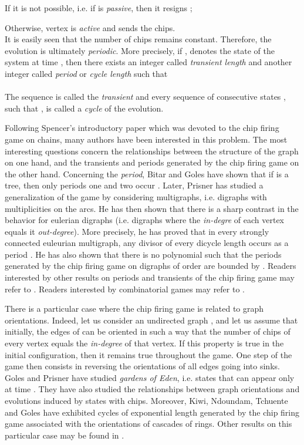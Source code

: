 \documentclass{article}
\begin{document}
\hspace{2mm} If it is not possible, i.e. if  is {\em passive}, then it
resigns ;

\hspace{2mm} Otherwise, vertex  is {\em active} and sends the chips.\\
It is easily seen that the number of chips remains constant. Therefore, the
evolution is ultimately {\em periodic}. More precisely, if ,
denotes the state of the system at time , then there exists an integer 
called {\em transient length} and another integer  called {\em period}
or  {\em cycle length } such that \\
\\
The sequence  is called the {\em transient} and every
sequence of  consecutive states , such that
, is called a {\em cycle} of the evolution.

Following Spencer's introductory paper \cite{SPE:86} which was devoted to the
chip firing game on chains, many authors have been interested in this
problem. The most interesting questions concern the relationships between the
structure of the graph on one hand, and the transients and periods generated
by the chip firing game on the other hand. Concerning the {\em period}, Bitar and
Goles have shown that if  is a tree, then only periods one and two occur
\cite{BIT:92}. Later, Prisner has studied a generalization of the game by
considering multigraphs, i.e. digraphs with multiplicities on the arcs. He
has then shown that there is a sharp contrast in the behavior for eulerian
digraphs (i.e. digraphs where the {\em in-degre} of each vertex equals it {\em
  out-degree}). More precisely, he has proved that in every strongly connected
euleurian multigraph, any divisor of every dicycle length occurs as a period
\cite{PRI:94}. He has also shown that there is no polynomial  such that
the periods generated by the chip firing game on digraphs of order  are
bounded by . Readers interested by other results on periods and
transients of the chip firing game may refer to \cite{TAR:88,AND:89,BIT:89,BJO:91,ERI:91,GOL:93}.
 Readers interested by combinatorial games may refer to \cite{Gol:02, GM:02, Gol:04, Sjo:05, Fra:09}.

There is a particular case where the chip firing game is related to graph
orientations. Indeed, let us consider an undirected graph , and let
us
assume that initially, the edges of  can be oriented in such a way that the
number of chips of every vertex equals the {\em in-degree} of that vertex. If
this property is true in the initial configuration, then it remains true throughout the
game. One step of the game then consists in reversing the orientations of all
edges going into sinks. Goles and Prisner \cite{GOL:00} have studied {\em gardens
of Eden}, i.e. states that can appear only at time . They have also
studied the relationships between graph orientations and evolutions induced by
states with  chips. Moreover, Kiwi, Ndoundam, Tchuente and Goles
\cite{KIW:94} have exhibited cycles of exponential length 
generated by the chip firing game associated with the orientations of cascades
of rings. Other results on this particular case may be found in \cite{ERI:94}.
\end{document}
